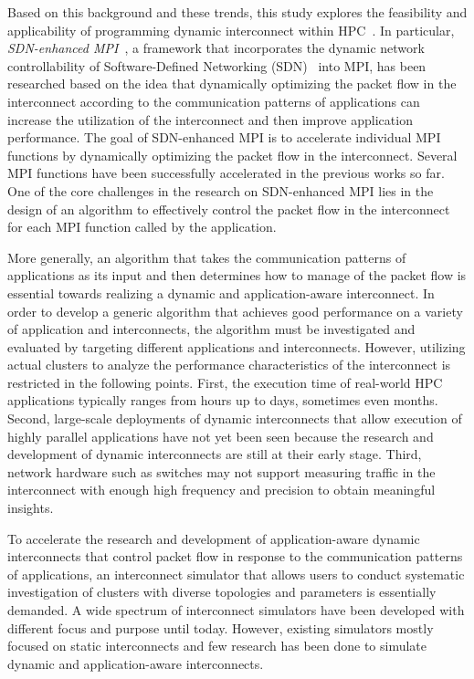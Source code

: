 Based on this background and these trends, this study explores the feasibility
and applicability of programming dynamic interconnect within
HPC~\autocite{Date2016}. In particular, \emph{SDN-enhanced
MPI}~\autocite{Takahashi2014,Dashdavaa2013}, a framework that incorporates
the dynamic network controllability of Software-Defined Networking
(SDN)~\autocite{sdn} into MPI, has been researched based on the idea that
dynamically optimizing the packet flow in the interconnect according to the
communication patterns of applications can increase the utilization of the
interconnect and then improve application performance. The goal of
SDN-enhanced MPI is to accelerate individual MPI functions by dynamically
optimizing the packet flow in the interconnect. Several MPI functions have
been successfully accelerated in the previous works so far. One of the core
challenges in the research on SDN-enhanced MPI lies in the design of an
algorithm to effectively control the packet flow in the interconnect for each
MPI function called by the application.

More generally, an algorithm that takes the communication patterns of
applications as its input and then determines how to manage of the packet flow
is essential towards realizing a dynamic and application-aware interconnect.
In order to develop a generic algorithm that achieves good performance on a
variety of application and interconnects, the algorithm must be investigated
and evaluated by targeting different applications and interconnects. However,
utilizing actual clusters to analyze the performance characteristics of the
interconnect is restricted in the following points. First, the execution time
of real-world HPC applications typically ranges from hours up to days,
sometimes even months. Second, large-scale deployments of dynamic
interconnects that allow execution of highly parallel applications have not
yet been seen because the research and development of dynamic interconnects
are still at their early stage. Third, network hardware such as switches may
not support measuring traffic in the interconnect with enough high frequency
and precision to obtain meaningful insights.

To accelerate the research and development of application-aware dynamic
interconnects that control packet flow in response to the communication
patterns of applications, an interconnect simulator that allows users to
conduct systematic investigation of clusters with diverse topologies and
parameters is essentially demanded. A wide spectrum of interconnect
simulators have been developed with different focus and purpose until
today. However, existing simulators mostly focused on static
interconnects and few research has been done to simulate dynamic and
application-aware interconnects.

